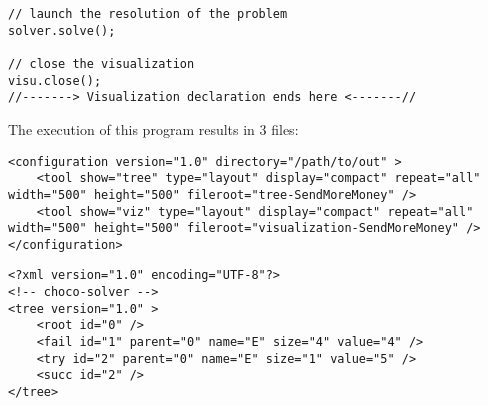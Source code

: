 \begin{lstlisting}[title=SendMoreMoney problem,captionpos=b]
// launch the resolution of the problem                                                                          
solver.solve();                                                                                                  
                                                                                                                 
// close the visualization                                                                                       
visu.close();                                                                                                    
//-------> Visualization declaration ends here <-------//                                                    
\end{lstlisting}

\medskip
The execution of this program results in 3 files:
\begin{lstlisting}[title=configuration-SendMoreMoney.xml, captionpos=b]
<configuration version="1.0" directory="/path/to/out" >
	<tool show="tree" type="layout" display="compact" repeat="all" width="500" height="500" fileroot="tree-SendMoreMoney" />
	<tool show="viz" type="layout" display="compact" repeat="all" width="500" height="500" fileroot="visualization-SendMoreMoney" />
</configuration>
\end{lstlisting}

\begin{lstlisting}[title=tree-SendMoreMoney.xml, captionpos=b]
<?xml version="1.0" encoding="UTF-8"?>
<!-- choco-solver -->
<tree version="1.0" >
	<root id="0" />
	<fail id="1" parent="0" name="E" size="4" value="4" />
	<try id="2" parent="0" name="E" size="1" value="5" />
	<succ id="2" />
</tree>
\end{lstlisting}

